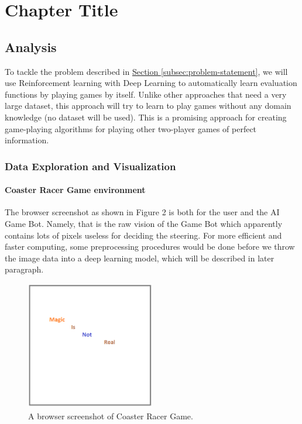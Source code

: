\chapter{Chapter Title} 


\section{Analysis}

To tackle the problem described in \hyperref[subsec:problem-statement]{Section \ref*{subsec:problem-statement}}, we will use Reinforcement learning with Deep Learning to automatically learn evaluation functions by playing games by itself. Unlike other approaches that need a very large dataset, this approach will try to learn to play games without any domain knowledge (no dataset will be used). This is a promising approach for creating game-playing algorithms for playing other two-player games of perfect information.

\subsection{Data Exploration and Visualization}

\subsubsection{Coaster Racer Game environment}

The browser screenshot as shown in Figure 2 is both for the user and the AI Game Bot. Namely, that is the raw vision of the Game Bot which apparently contains lots of pixels useless for deciding the steering. For more efficient and faster computing, some preprocessing procedures would be done before we throw the image data into a deep learning model, which will be described in later paragraph.

\begin{figure}[h]
\centering
\includegraphics[width=0.5\textwidth]{figs/magic}
\caption{A browser screenshot of Coaster Racer Game.}
\end{figure}

